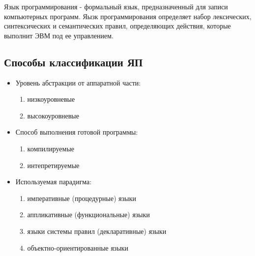\begin{definition}
  Язык программирования - формальный язык, предназначенный для записи компьютерных программ. Яызк программирования определяет набор лексических, синтексических и семантических правил, определяющих действия, которые выполнит ЭВМ под ее управлением.
\end{definition}

\subsection{Способы классификации ЯП}
\begin{itemize}
  \item Уровень абстракции от аппаратной части:
    \begin{enumerate}
      \item низкоуровневые
      \item высокоуровневые
    \end{enumerate}
  \item Способ выполнения готовой программы:
    \begin{enumerate}
      \item компилируемые
      \item интепретируемые
    \end{enumerate}
  \item Используемая парадигма:
    \begin{enumerate}
      \item императивные (процедурные) языки
      \item аппликативные (функциональные) языки
      \item языки системы правил (декларативные) языки
      \item объектно-ориентированные языки
    \end{enumerate}
\end{itemize}

